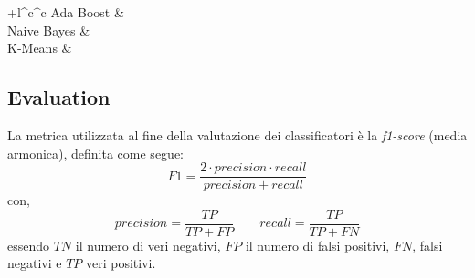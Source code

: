 \begin{center}
\begin{tabular}{+l^c^c}
						 \midrule
						 Ada Boost &   \\
						 \midrule
						 Naive Bayes &  \\
						 \midrule
						 K-Means & \\
 
                		\toprule\rowstyle{\bfseries}
                	\end{tabular}
                	\label{tab:f1scoreML}
                \end{center}
                

        \subsection{Evaluation}
        
                La metrica utilizzata al fine della valutazione dei classificatori è la \textit{f1-score} (media armonica), definita come segue:
                \begin{displaymath}
                F1 = \frac{2 \cdot precision \cdot recall}{precision + recall}
                \end{displaymath}
                con,
                \begin{displaymath}
                precision = \frac{TP}{TP + FP} \qquad recall = \frac{TP}{TP + FN}
                \end{displaymath}
                essendo $TN$ il numero di veri negativi, $FP$ il numero di falsi positivi, $FN$, falsi negativi e $TP$ veri positivi.